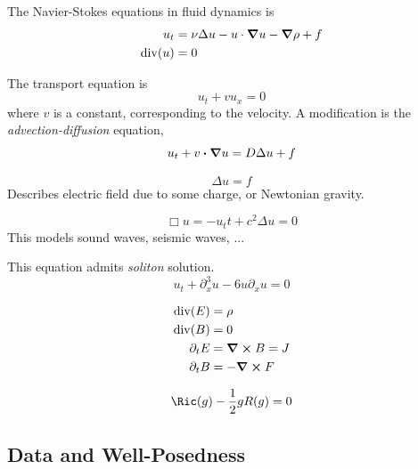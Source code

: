 \documentclass{article}
\begin{document}
\begin{example}
    The Navier-Stokes equations in fluid dynamics is
    \begin{align*}
        u_t &= \nu\Delta u - u \cdot \grad u - \grad \rho + f \\
        \mathrm{div}(u) &= 0
    \end{align*}
\end{example}

\begin{example}

    The transport equation is
    \[u_t + vu_x = 0\]
    where \(v\) is a constant, corresponding to the velocity. A modification is the \emph{advection-diffusion} equation,
    \[u_t + v \vdot \grad u = D\Delta u + f\]
\end{example}

\begin{example}
    \[\Delta u = f\]
    Describes electric field due to some charge, or Newtonian gravity.
\end{example}

\begin{example}
    \[\Box u = -u_tt + c^2 \Delta u = 0\]
    This models sound waves, seismic waves, ...
\end{example}

\begin{example}
    This equation admits \emph{soliton} solution.
    \[u_t + \partial_x^3 u - 6u\partial_x u = 0\]
\end{example}

\begin{example}
    \begin{align*}
        \mathrm{div}(E) &= \rho \\
        \mathrm{div}(B) &= 0 \\
        \partial_t E &= \curl B = J \\
        \partial_t B &= -\curl F
    \end{align*}
\end{example}

\begin{example}
    \[\Ric(g) - \frac{1}{2}gR(g) = 0\]
\end{example}

\subsection{Data and Well-Posedness}
\end{document}
